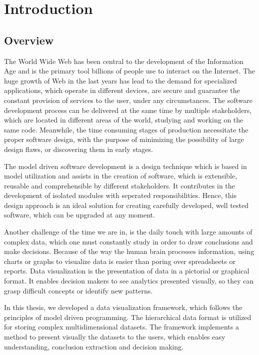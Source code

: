 
\chapter{Introduction} %

\section{Overview}
The World Wide Web has been central to the development of the Information Age and is the primary tool billions of people use to interact on the Internet. The huge growth of Web in the last years has lead to the demand for specialized applications, which operate in different devices, are secure and guarantee the constant provision of services to the user, under any circumstances. The software development 
process can be delivered at the same time by multiple stakeholders, which are located in different areas of the world, studying and working on the same code. Meanwhile, the time consuming stages of production necessitate the proper software design, with the purpose of minimizing the possibility of large design flaws, or discovering them in early stages. \par 
	The model driven software development is a design technique which is based in model utilization and assists in the creation of software, which is extensible, reusable and comprehensible by different stakeholders. It contributes in the development of isolated modules with seperated responsibilities. Hence, this design approach is an ideal solution for creating carefully developed, well tested software, which can be upgraded at any moment. \par 
	Another challenge of the time we are in, is the daily touch with large amounts of complex data, which one must constantly study in order to draw conclusions and make decisions. Because of the way the human brain processes information, using charts or graphs to visualize data is easier than poring over spreadsheets or reports. Data visualization is the presentation of data in a pictorial or graphical format. It enables decision makers to see analytics presented visually, so they can grasp difficult concepts or identify new patterns. \par
	In this thesis, we developed a data visualization framework, which follows the principles of model driven programming. The hierarchical data format is utilized for storing complex multidimensional datasets. The framework implements a method to present visually the datasets to the users, which enables easy understanding, conclusion extraction and decision making. \par 
